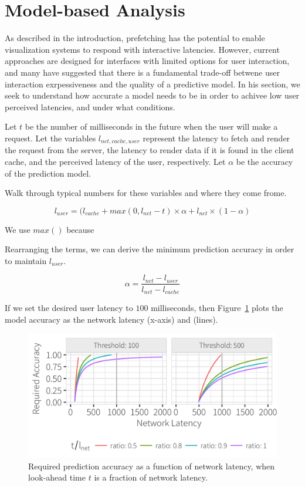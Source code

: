 
\section{Model-based Analysis}

As described in the introduction, prefetching has the potential to enable visualization systems to respond with interactive latencies.  However, current approaches are designed for interfaces with limited options for user interaction, and many have suggested that there is a fundamental trade-off betwene user interaction exrpessiveness and the quality of a predictive model.  In his section, we seek to understand how accurate a model needs to be in order to achivee low user perceived latencies, and under what conditions.


Let $t$ be the number of milliseconds in the future when the user will make a request.
Let the variables $l_{net,cache,user}$ represent the latency to fetch and render the request from the server,
the latency to render data if it is found in the client cache, and the perceived latency of the user, respectively.
Let $\alpha$ be the accuracy of the prediction model.

Walk through typical numbers for these variables and where they come frome.

$$l_{user} = (l_{cache} + max(0, l_{net} - t)\times \alpha + l_{net}\times(1-\alpha) $$

We use $max()$ because 

Rearranging the terms, we can derive the minimum prediction accuracy in order to maintain $l_{user}$.

$$\alpha = \frac{l_{net} - l_{user}}{l_{net} - l_{cache}}$$

If we set the desired user latency to $100$ milliseconds, then Figure~\ref{fig:model_base} plots the model accuracy as the network latency (x-axis) and  (lines).

\begin{figure}
	\centering
	\includegraphics[width=1\columnwidth]{figures/model_base}
 	\caption{Required prediction accuracy as a function of network latency, when look-ahead time $t$ is a fraction of network latency.}
    \label{fig:model_base}
\end{figure}

